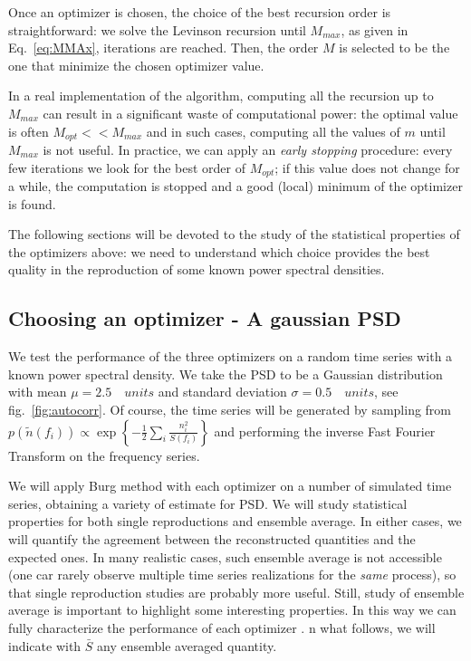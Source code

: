 \documentclass[twocolumn,showpacs,preprintnumbers,nofootinbib,prd,
superscriptaddress,10pt]{revtex4-1}
\begin{document}
Once an optimizer is chosen, the choice of the best recursion order is straightforward: we solve the Levinson recursion until $M_{max}$, as given in Eq.~\ref{eq:MMAx}, iterations are reached. Then, the order $M$ is selected to be the one that minimize the chosen optimizer value.

In a real implementation of the algorithm, computing all the recursion up to $M_{max}$ can result in a significant waste of computational power: the optimal value is often $M_{opt}<< M_{max}$ and in such cases, computing all the values of $m$ until $M_{max}$ is not useful.
In practice, we can apply an \textit{early stopping} procedure: every few iterations we look for the best order of $M_{opt}$; if this value does not change for a while, the computation is stopped and a good (local) minimum of the optimizer is found.

The following sections will be devoted to the study of the statistical properties of the optimizers above: we need to understand which choice provides the best quality in the reproduction of some known power spectral densities. 

\subsection{Choosing an optimizer - A gaussian PSD} \label{sec:arp_validation}
We test the performance of the three optimizers on a random time series with a known power spectral density.
We take the PSD to be a Gaussian distribution with mean $\mu = 2.5 \quad units$ and standard deviation $\sigma = 0.5 \quad units$, see fig.~\ref{fig:autocorr}.
Of course, the time series will be generated by sampling from ${p(\tilde{n}(f_i)) \propto \exp{\left\{-\frac{1}{2}\sum_i\frac{n_i ^2}{S(f_i)}\right\}}}$ and performing the inverse Fast Fourier Transform on the frequency series.

We will apply Burg method with each optimizer on a number of simulated time series, obtaining a variety of estimate for PSD.
We will study statistical properties for both single reproductions and ensemble average. In either cases, we will quantify the agreement between the reconstructed quantities and the expected ones.
In many realistic cases, such ensemble average is not accessible (one car rarely observe multiple time series realizations for the \textit{same} process), so that single reproduction studies are probably more useful. Still, study of ensemble average is important to highlight some interesting properties. In this way we can fully characterize the performance of each optimizer .
n what follows, we will indicate with $\bar S$ any ensemble averaged quantity.
\end{document}
